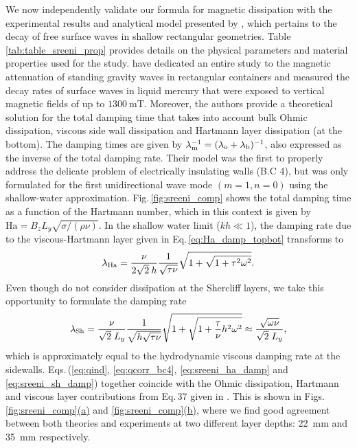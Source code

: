 \documentclass[aps,prfluids,reprint,superscriptaddress]{revtex4-2}
\newcommand{\ii}[1]{\text{#1}}
\newcommand{\subref}[2]{\ref{#1}\hyperref[#1]{(#2)}}
\begin{document}
We now independently validate our formula for magnetic dissipation with the experimental results and analytical model presented by \citet{Sreenivasan2005}, which pertains to the decay of free surface waves in shallow rectangular geometries. Table\,\ref{tab:table_sreeni_prop} provides details on the physical parameters and material properties used for the study. \citet{Sreenivasan2005} have dedicated an entire study to the magnetic attenuation of standing gravity waves in rectangular containers and measured the decay rates of surface waves in liquid mercury that were exposed to vertical magnetic fields of up to  $\SI{1300}{\milli\tesla}$. Moreover, the authors provide a theoretical solution for the total damping time that takes into account bulk Ohmic dissipation, viscous side wall dissipation and Hartmann layer dissipation (at the bottom). The damping times are given by $\lambda_{\rm m}^{-1} = (\lambda_{\rm o}+\lambda_{\rm b})^{-1}$, also expressed as the inverse of the total damping rate. Their model was the first to properly address the delicate problem of electrically insulating walls (B.C 4), but was only formulated for the first unidirectional wave mode $(m=1,n=0)$ using the shallow-water approximation. Fig.\,\ref{fig:sreeni_comp} shows the total damping time as a function of the Hartmann number, which in this context is given by $\ii{Ha} = B_zL_y\sqrt{\sigma/(\rho\nu)}$. In the shallow water limit ($kh\ll1$), the damping rate due to the viscous-Hartmann layer given in Eq.\,\eqref{eq:Ha_damp_topbot} transforms to 
\begin{equation}
	\lambda_{\rm Ha}
	= 
	\frac{\nu}{2\sqrt{2}\:h}
	\dfrac{1}{\sqrt{\tau\nu}}
	\sqrt{1 + \sqrt{1 + \tau^2\omega^2} }.
	\label{eq:sreeni_ha_damp}
\end{equation}
Even though \citet{Sreenivasan2005} do not consider dissipation at the Shercliff layers, we take this opportunity to formulate the damping rate
\begin{equation}
	\lambda_{\rm Sh} = \frac{\nu}{\sqrt{2} \;L_y}
	\frac{1}{\sqrt{h\sqrt{\tau\nu}}}
	\sqrt{ 1 + \sqrt{1 + \frac{\tau}{\nu}h^2\omega^2 }}
	\approx 
	\frac{\sqrt{\omega\nu}}{\sqrt{2} \;L_y}
	,
	\label{eq:sreeni_sh_damp}
\end{equation}
which is approximately equal to the hydrodynamic viscous damping rate at the sidewalls. Eqs.\,(\ref{eq:qind}, \ref{eq:qcorr_bc4}, \ref{eq:sreeni_ha_damp} and \ref{eq:sreeni_sh_damp}) together coincide with the Ohmic dissipation, Hartmann and viscous layer contributions from Eq.\,37 given in \cite{Sreenivasan2005}. This is shown in Figs.\,\subref{fig:sreeni_comp}{a} and \subref{fig:sreeni_comp}{b}, where we find good agreement between both theories and experiments at two different layer depths: \SI{22}{\milli\meter} and \SI{35}{\milli\meter} respectively. 
\end{document}
